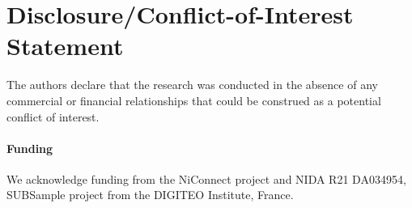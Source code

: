 \documentclass{frontiersSCNS} %
\begin{document}
\section*{Disclosure/Conflict-of-Interest Statement}
The authors declare that the research was conducted in the absence of any
commercial or financial relationships that could be construed as a potential
conflict of interest.

\paragraph{Funding\textcolon} We acknowledge funding from the NiConnect
project and NIDA R21 DA034954, SUBSample project from the DIGITEO
Institute, France.


\end{document}
